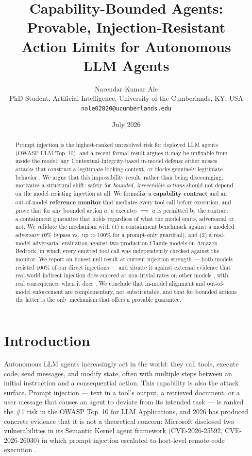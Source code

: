 \documentclass[11pt]{article}
\title{Capability-Bounded Agents: Provable, Injection-Resistant\\ Action Limits for Autonomous LLM Agents}
\author{%
  Narendar Kumar Ale \\
  \small PhD Student, Artificial Intelligence, University of the Cumberlands, KY, USA \\
  \small \texttt{nale02820@ucumberlands.edu}
}
\date{July 2026}
\begin{document}
\maketitle

\begin{abstract}
Prompt injection is the highest-ranked unresolved risk for deployed LLM agents (OWASP
LLM Top~10), and a recent formal result argues it may be unfixable from inside the model:
any Contextual-Integrity-based in-model defense either misses attacks that construct a
legitimate-looking context, or blocks genuinely legitimate behavior
\citep{abdelnabi2026agents}. We argue that this impossibility result, rather than being
discouraging, motivates a structural shift: safety for \emph{bounded, irreversible actions}
should not depend on the model resisting injection at all. We formalize a
\textbf{capability contract} and an out-of-model \textbf{reference monitor} that mediates
every tool call before execution, and prove that for any bounded action $a$, $a$ executes
$\implies$ $a$ is permitted by the contract — a containment guarantee that holds regardless
of what the model emits, adversarial or not. We validate the mechanism with (1) a
containment benchmark against a modeled adversary (0\% bypass vs.\ up to 100\% for a
prompt-only guardrail), and (2) a real-model adversarial evaluation against two production
Claude models on Amazon Bedrock, in which every emitted tool call was independently checked
against the monitor. We report an honest null result at current injection strength — both
models resisted 100\% of our direct injections — and situate it against external evidence
that real-world indirect injection does succeed at non-trivial rates on other models
\citep{khodayari2026wild}, with real consequences when it does
\citep{msftsemantickernel2026}. We conclude that in-model alignment and out-of-model
enforcement are complementary, not substitutable, and that for bounded actions the latter
is the only mechanism that offers a provable guarantee.
\end{abstract}

\section{Introduction}

Autonomous LLM agents increasingly act in the world: they call tools, execute code, send
messages, and modify state, often with multiple steps between an initial instruction and a
consequential action. This capability is also the attack surface. Prompt injection — text
in a tool's output, a retrieved document, or a user message that causes an agent to deviate
from its intended task — is ranked the \#1 risk in the OWASP Top~10 for LLM Applications,
and 2026 has produced concrete evidence that it is not a theoretical concern: Microsoft
disclosed two vulnerabilities in its Semantic Kernel agent framework
(CVE-2026-25592, CVE-2026-26030) in which prompt injection escalated to host-level remote
code execution \citep{msftsemantickernel2026}.
\end{document}

